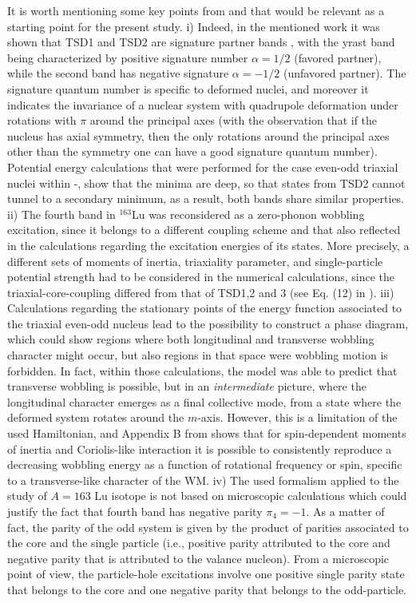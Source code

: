 \documentclass[%
 reprint,
 amsmath,
 amssymb,
 aps,
]{revtex4-2}
\begin{document}
It is worth mentioning some key points from \cite{raduta2020towards} and \cite{raduta2020new} that would be relevant as a starting point for the present study. i) Indeed, in the mentioned work it was shown that TSD1 and TSD2 are signature partner bands \cite{sun1994varied}, with the yrast band being characterized by positive signature number $\alpha=1/2$ (favored partner), while the second band has negative signature $\alpha=-1/2$ (unfavored partner). The signature quantum number is specific to deformed nuclei, and moreover it indicates the invariance of a nuclear system with quadrupole deformation under rotations with $\pi$ around the principal axes (with the observation that if the nucleus has axial symmetry, then the only rotations around the principal axes other than the symmetry one can have a good signature quantum number). Potential energy calculations that were performed for the case even-odd triaxial nuclei within \cite{raduta2016specific}-\cite{raduta2017semiclassical}, show that the minima are deep, so that states from TSD2 cannot tunnel to a secondary minimum, as a result, both bands share similar properties. ii) The fourth band in $^{163}$Lu was reconsidered as a zero-phonon wobbling excitation, since it belongs to a different coupling scheme and that also reflected in the calculations regarding the excitation energies of its states. More precisely, a different sets of moments of inertia, triaxiality parameter, and single-particle potential strength had to be considered in the numerical calculations, since the triaxial-core-coupling differed from that of TSD1,2 and 3 (see Eq. (12) in \cite{raduta2020new}). iii) Calculations regarding the stationary points of the energy function associated to the triaxial even-odd nucleus lead to the possibility to construct a phase diagram, which could show regions where both longitudinal and transverse wobbling character might occur, but also regions in that space were wobbling motion is forbidden. In fact, within those calculations, the model was able to predict that transverse wobbling is possible, but in an \emph{intermediate} picture, where the longitudinal character emerges as a final collective mode, from a state where the deformed system rotates around the $m$-axis. However, this is a limitation of the used Hamiltonian, and Appendix B from \cite{raduta2020new} shows that for spin-dependent moments of inertia and Coriolis-like interaction it is possible to consistently reproduce a decreasing wobbling energy as a function of rotational frequency or spin, specific to a transverse-like character of the WM. iv) The used formalism applied to the study of $A=163$ Lu isotope is not based on microscopic calculations which could justify the fact that fourth band has negative parity $\pi_4=-1$. As a matter of fact, the parity of the odd system is given by the product of parities associated to the core and the single particle (i.e., positive parity attributed to the core and negative parity that is attributed to the valance nucleon). From a microscopic point of view, the particle-hole excitations involve one positive single parity state that belongs to the core and one negative parity that belongs to the odd-particle.
\end{document}
